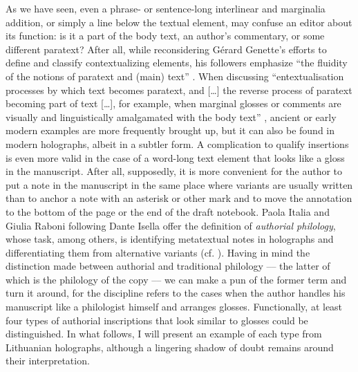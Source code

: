 \documentclass{article}
\begin{document}
As we have seen, even a phrase- or sentence-long interlinear and
marginalia addition, or simply a line below the textual element, may
confuse an editor about its function: is it a part of the
body text, an author's commentary, or some different paratext? After
all, while reconsidering Gérard Genette's efforts to define and classify
contextualizing elements, his followers emphasize ``the fluidity of the
notions of paratext and (main) text'' \citep*[21]{bos_framing_2020}. When
discussing ``entextualisation processes by which text becomes paratext,
and [\ldots] the reverse process of paratext becoming part of text
[\ldots], for example, when marginal glosses or comments are visually
and linguistically amalgamated with the body text'' \citep[21]{bos_framing_2020}, ancient or early modern examples are more frequently brought
up, but it can also be found in modern holographs, albeit in a subtler
form. A complication to qualify insertions is even more valid in the
case of a word-long text element that looks like a gloss in the
manuscript. After all, supposedly, it is more convenient for the author
to put a note in the manuscript in the same place where variants are
usually written than to anchor a note with an asterisk or other mark and
to move the annotation to the bottom of the page or the end of the draft
notebook. Paola Italia and Giulia Raboni following Dante Isella offer
the definition of \emph{authorial philology}, whose task, among others,
is identifying metatextual notes in holographs and differentiating them
from alternative variants (cf. \citealt[57--58]{italia_what_2021}).
Having in mind the distinction made between authorial and traditional
philology –– the latter of which is the philology of the copy –– we
can make a pun of the former term and turn it around, for the discipline
refers to the cases when the author handles his manuscript like a
philologist himself and arranges glosses. Functionally, at least four
types of authorial inscriptions that look similar to glosses could be
distinguished. In what follows, I will present an example of each type from Lithuanian
holographs, although a lingering shadow of doubt remains around their
interpretation.
\end{document}
